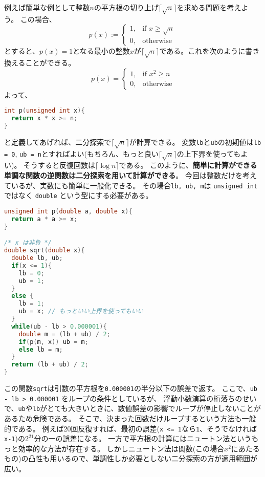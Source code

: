 \documentclass[a4paper,twoside,onecolumn,openany,article,10pt]{memoir}
\theoremstyle{remark}
\begin{document}
例えば簡単な例として整数$n$の平方根の切り上げ$\lceil \sqrt{n}\rceil$を求める問題を考えよう。
この場合、
\begin{equation*}
p(x) :=
\begin{cases}
1,& \text{if } x \ge \sqrt{n}\\
0,& \text{otherwise}
\end{cases}
\end{equation*}
とすると、$p(x)=1$となる最小の整数$x$が$\lceil\sqrt{n}\rceil$である。これを次のように書き換えることができる。
\begin{equation*}
p(x) =
\begin{cases}
1,& \text{if } x^2 \ge n\\
0,& \text{otherwise}
\end{cases}
\end{equation*}
よって、
\begin{lstlisting}[basicstyle=\ttfamily\normalsize,showstringspaces=false,language=C,frame=single]
int p(unsigned int x){
  return x * x >= n;
}
\end{lstlisting}
と定義してあげれば、二分探索で$\lceil \sqrt{n}\rceil$が計算できる。
変数\texttt{lb}と\texttt{ub}の初期値は\texttt{lb = 0}, \texttt{ub = n}とすればよい(もちろん、もっと良い$\lceil\sqrt{n}\rceil$の上下界を使ってもよい)。
そうすると反復回数は$\lceil\log n\rceil$である。
このように、\textbf{簡単に計算ができる単調な関数の逆関数は二分探索を用いて計算ができる}。
今回は整数だけを考えているが、実数にも簡単に一般化できる。
その場合\texttt{lb, ub, m}は \texttt{unsigned int} ではなく \texttt{double} という型にする必要がある。
\begin{lstlisting}[basicstyle=\ttfamily\normalsize,showstringspaces=false,language=C,frame=single]
unsigned int p(double a, double x){
  return a * a >= x;
}

/* x は非負 */
double sqrt(double x){
  double lb, ub;
  if(x <= 1){
    lb = 0;
    ub = 1;
  }
  else {
    lb = 1;
    ub = x; // もっといい上界を使ってもいい
  }
  while(ub - lb > 0.000001){
    double m = (lb + ub) / 2;
    if(p(m, x)) ub = m;
    else lb = m;
  }
  return (lb + ub) / 2;
}
\end{lstlisting}
この関数\texttt{sqrt}は引数の平方根を\texttt{0.000001}の半分以下の誤差で返す。
ここで、\texttt{ub - lb > 0.000001} をループの条件としているが、
浮動小数演算の桁落ちのせいで、\texttt{ub}や\texttt{lb}がとても大きいときに、数値誤差の影響でループが停止しないことがあるため危険である。
そこで、決まった回数だけループするという方法も一般的である。
例えば20回反復すれば、最初の誤差(\texttt{x <= 1}なら\texttt{1}、そうでなければ\texttt{x-1})の$2^{21}$分の一の誤差になる。
一方で平方根の計算にはニュートン法というもっと効率的な方法が存在する。
しかしニュートン法は関数(この場合$x^2$にあたるもの)の凸性も用いるので、単調性しか必要としない二分探索の方が適用範囲が広い。
\end{document}
